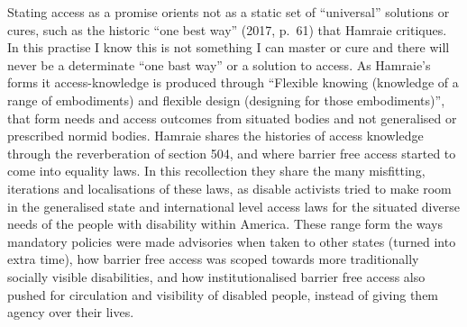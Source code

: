 Stating access as a promise orients not as a static set of ``universal''
solutions or cures, such as the historic ``one best way'' (2017, p.~61)
that Hamraie critiques. In this practise I know this is not something I
can master or cure and there will never be a determinate ``one bast
way'' or a solution to access. As Hamraie's forms it access-knowledge is
produced through ``Flexible knowing (knowledge of a range of
embodiments) and flexible design (designing for those embodiments)'',
that form needs and access outcomes from situated bodies and not
generalised or prescribed normid bodies. Hamraie shares the histories of
access knowledge through the reverberation of section 504, and where
barrier free access started to come into equality laws. In this
recollection they share the many misfitting, iterations and
localisations of these laws, as disable activists tried to make room in
the generalised state and international level access laws for the
situated diverse needs of the people with disability within America.
These range form the ways mandatory policies were made advisories when
taken to other states (turned into extra time), how barrier free access
was scoped towards more traditionally socially visible disabilities, and
how institutionalised barrier free access also pushed for circulation
and visibility of disabled people, instead of giving them agency over
their lives.

